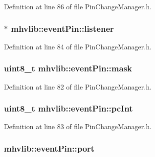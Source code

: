Definition at line 86 of file Pin\-Change\-Manager.\-h.

\hypertarget{structmhvlib_1_1event_pin_ae901f8f0914478b67fdd85b31c87c5a4}{
\subsubsection[{listener}]{$\ast$ mhvlib\-::event\-Pin\-::listener}}\label{structmhvlib_1_1event_pin_ae901f8f0914478b67fdd85b31c87c5a4}


Definition at line 84 of file Pin\-Change\-Manager.\-h.

\hypertarget{structmhvlib_1_1event_pin_a19bb0749006218fc3f73c5c3d7d440fa}{
\subsubsection[{mask}]{\setlength{\rightskip}{0pt plus 5cm}uint8\-\_\-t mhvlib\-::event\-Pin\-::mask}}\label{structmhvlib_1_1event_pin_a19bb0749006218fc3f73c5c3d7d440fa}


Definition at line 82 of file Pin\-Change\-Manager.\-h.

\hypertarget{structmhvlib_1_1event_pin_aaf8901e6810fc3e41ee99bb70c7b689f}{
\subsubsection[{pc\-Int}]{\setlength{\rightskip}{0pt plus 5cm}uint8\-\_\-t mhvlib\-::event\-Pin\-::pc\-Int}}\label{structmhvlib_1_1event_pin_aaf8901e6810fc3e41ee99bb70c7b689f}


Definition at line 83 of file Pin\-Change\-Manager.\-h.

\hypertarget{structmhvlib_1_1event_pin_ad0281c89bd5d5aea84e128be1b67c1f9}{
\subsubsection[{port}]{ mhvlib\-::event\-Pin\-::port}}\label{structmhvlib_1_1event_pin_ad0281c89bd5d5aea84e128be1b67c1f9}


